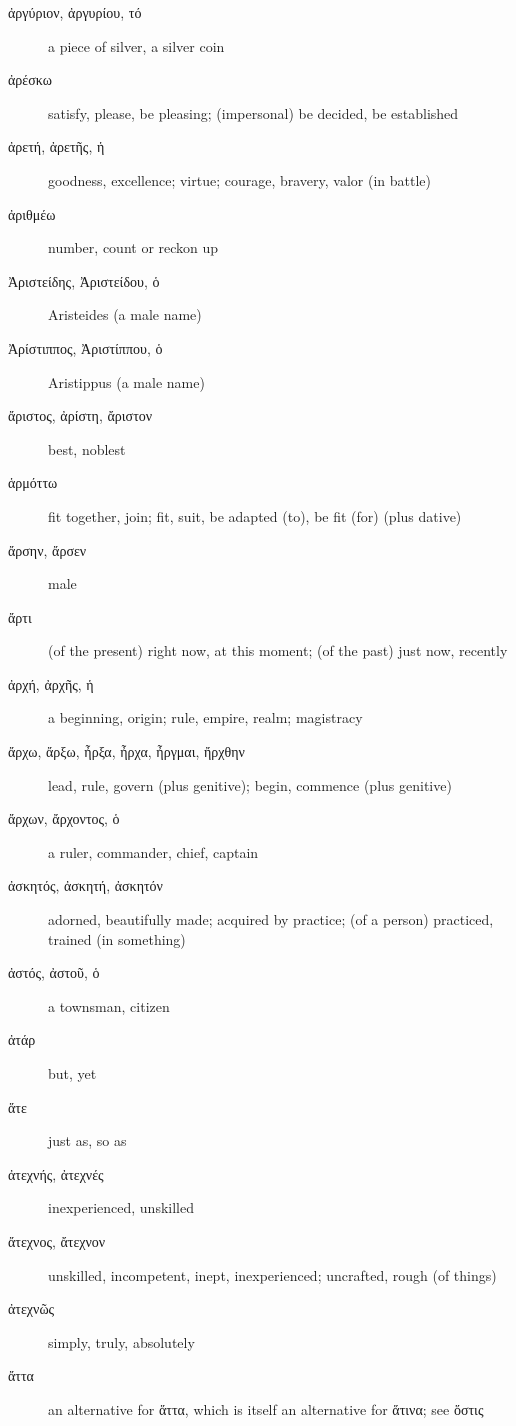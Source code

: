 \documentclass[12pt,letterpaper]{article}
\begin{document}
\begin{description}
    \item[\textgreek{ἀργύριον, ἀργυρίου, τό}] \marginnote{*}a piece of silver, a silver coin
    \item[\textgreek{ἀρέσκω}] satisfy, please, be pleasing; (impersonal) be decided, be established
    \item[\textgreek{ἀρετή, ἀρετῆς, ἡ}] \marginnote{*}goodness, excellence; virtue; courage, bravery, valor (in battle)
    \item[\textgreek{ἀριθμέω}] number, count or reckon up
    \item[\textgreek{Ἀριστείδης, Ἀριστείδου, ὁ}] Aristeides (a male name)
    \item[\textgreek{Ἀρίστιππος, Ἀριστίππου, ὁ}] Aristippus (a male name)
    \item[\textgreek{ἄριστος, ἀρίστη, ἄριστον}] \marginnote{*}best, noblest
    \item[\textgreek{ἁρμόττω}] fit together, join; fit, suit, be adapted (to), be fit (for) (plus dative)
    \item[\textgreek{ἄρσην, ἄρσεν}] male
    \item[\textgreek{ἄρτι}] (of the present) right now, at this moment; (of the past) just now, recently
    \item[\textgreek{ἀρχή, ἀρχῆς, ἡ}] \marginnote{*}a beginning, origin; rule, empire, realm; magistracy
    \item[\textgreek{ἄρχω, ἄρξω, ἦρξα, ἦρχα, ἦργμαι, ἤρχθην}] \marginnote{*}lead, rule, govern (plus genitive); begin, commence (plus genitive)
    \item[\textgreek{ἄρχων, ἄρχοντος, ὁ}] a ruler, commander, chief, captain
    \item[\textgreek{ἀσκητός, ἀσκητή, ἀσκητόν}] adorned, beautifully made; acquired by practice; (of a person) practiced, trained (in something)
    \item[\textgreek{ἀστός, ἀστοῦ, ὁ}] a townsman, citizen
    \item[\textgreek{ἀτάρ}] but, yet
    \item[\textgreek{ἅτε}] just as, so as
    \item[\textgreek{ἀτεχνής, ἀτεχνές}] inexperienced, unskilled
    \item[\textgreek{ἄτεχνος, ἄτεχνον}] unskilled, incompetent, inept, inexperienced; uncrafted, rough (of things)
    \item[\textgreek{ἀτεχνῶς}] simply, truly, absolutely
    \item[\textgreek{ἄττα}] an alternative for \textgreek{ἅττα}, which is itself an alternative for \textgreek{ἅτινα}; see \textgreek{ὅστις}

\end{description}
\end{document}

